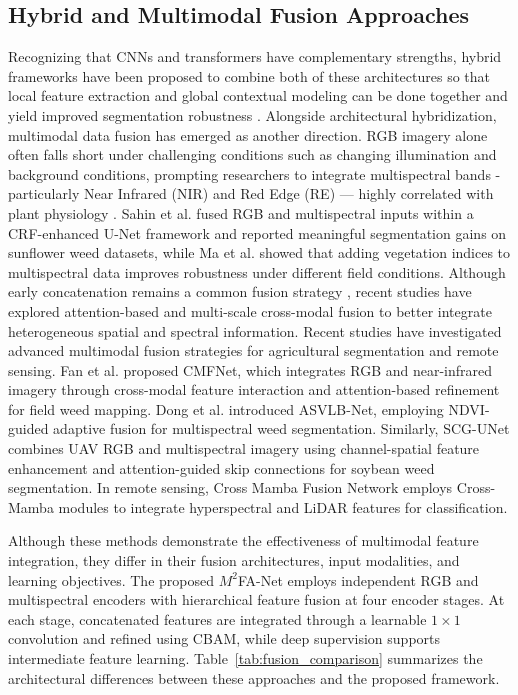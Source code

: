 \documentclass[pdflatex,sn-mathphys-num]{sn-jnl}
\newcommand{\rev}[1]{{\color{revisionblue}#1}}
\newenvironment{revblock}{\color{revisionblue}}{}
\begin{document}
\subsection{Hybrid and Multimodal Fusion Approaches}
Recognizing that CNNs and transformers have complementary strengths, hybrid frameworks have been proposed to combine both of these architectures so that local feature extraction and global contextual modeling can be done together and yield improved segmentation robustness \cite{zhou2018unet++}. Alongside architectural hybridization, multimodal data fusion has emerged as another direction. RGB imagery alone often falls short under challenging conditions such as changing illumination and background conditions, prompting researchers to integrate multispectral bands - particularly Near Infrared (NIR) and Red Edge (RE) — highly correlated with plant physiology \cite{zhang2021multispectral}. Sahin et al. \cite{sahin2023segmentation} fused RGB and multispectral inputs within a CRF-enhanced U-Net framework and reported meaningful segmentation gains on sunflower weed datasets, while Ma et al. \cite{ma2024vegetation_dl} showed that adding vegetation indices to multispectral data improves robustness under different field conditions. \rev{Although early concatenation remains a common
fusion strategy \cite{li2022attention_agriculture,
yang2025rshrnet}, recent studies have explored
attention-based and multi-scale cross-modal fusion
to better integrate heterogeneous spatial and
spectral information.} \begin{revblock}
Recent studies have investigated advanced multimodal
fusion strategies for agricultural segmentation and
remote sensing. Fan et al. \cite{fan2024cmfnet} proposed CMFNet,
which integrates RGB and near-infrared imagery through
cross-modal feature interaction and attention-based
refinement for field weed mapping. Dong et al. \cite{dong2026asvlb}
introduced ASVLB-Net, employing NDVI-guided adaptive
fusion for multispectral weed segmentation. Similarly,
SCG-UNet\cite{li2026scgunet} combines UAV RGB and multispectral
imagery using channel-spatial feature enhancement and
attention-guided skip connections for soybean weed
segmentation. In remote sensing, Cross Mamba Fusion
Network\cite{cmfnet2025mamba} employs Cross-Mamba modules to integrate
hyperspectral and LiDAR features for classification.

Although these methods demonstrate the effectiveness
of multimodal feature integration, they differ in
their fusion architectures, input modalities, and
learning objectives. The proposed $M^2$FA-Net
employs independent RGB and multispectral encoders
with hierarchical feature fusion at four encoder
stages. At each stage, concatenated features are
integrated through a learnable $1\times1$ convolution
and refined using CBAM, while deep supervision
supports intermediate feature learning.
Table~\ref{tab:fusion_comparison} summarizes the
architectural differences between these approaches
and the proposed framework.
\end{revblock}
\end{document}
